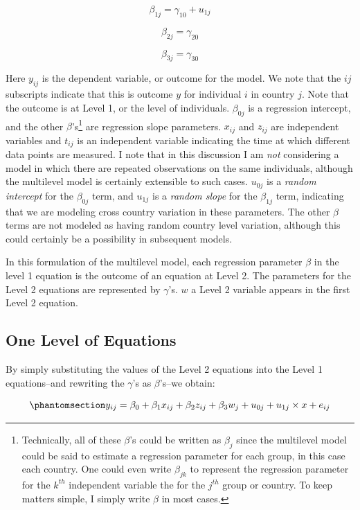 \documentclass[
  letterpaper,
  DIV=11,
  numbers=noendperiod]{scrreprt}
\begin{document}
\[\beta_{1j} = \gamma_{10} + u_{1j}\]

\[\beta_{2j} = \gamma_{20}\]

\[\beta_{3j} = \gamma_{30}\]

Here \(y_{ij}\) is the dependent variable, or outcome for the model. We
note that the \(ij\) subscripts indicate that this is outcome \(y\) for
individual \(i\) in country \(j\). Note that the outcome is at Level 1,
or the level of individuals. \(\beta_{0j}\) is a regression intercept,
and the other \(\beta\)'s\footnote{Technically, all of these \(\beta\)'s
  could be written as \(\beta_j\) since the multilevel model could be
  said to estimate a regression parameter for each group, in this case
  each country. One could even write \(\beta_{jk}\) to represent the
  regression parameter for the \(k^{th}\) independent variable the for
  the \(j^{th}\) group or country. To keep matters simple, I simply
  write \(\beta\) in most cases.} are regression slope parameters.
\(x_{ij}\) and \(z_{ij}\) are independent variables and \(t_{ij}\) is an
independent variable indicating the time at which different data points
are measured. I note that in this discussion I am \emph{not} considering
a model in which there are repeated observations on the same
individuals, although the multilevel model is certainly extensible to
such cases. \(u_{0j}\) is a \emph{random intercept} for the
\(\beta_{0j}\) term, and \(u_{1j}\) is a \emph{random slope} for the
\(\beta_{1j}\) term, indicating that we are modeling cross country
variation in these parameters. The other \(\beta\) terms are not modeled
as having random country level variation, although this could certainly
be a possibility in subsequent models. 

In this formulation of the multilevel model, each regression parameter
\(\beta\) in the level 1 equation is the outcome of an equation at Level
2. The parameters for the Level 2 equations are represented by
\(\gamma\)'s. \(w\) a Level 2 variable appears in the first Level 2
equation.

\subsection{One Level of Equations}\label{one-level-of-equations}

By simply substituting the values of the Level 2 equations into the
Level 1 equations--and rewriting the \(\gamma\)'s as \(\beta\)'s--we
obtain:

\begin{equation}\phantomsection\label{eq-MLM}{y_{ij} = \beta_0 + \beta_1 x_{ij} + \beta_2 z_{ij} + \beta_3 w_{j} + u_{0j} + u_{1j} \times x + e_{ij}}\end{equation}
\end{document}
